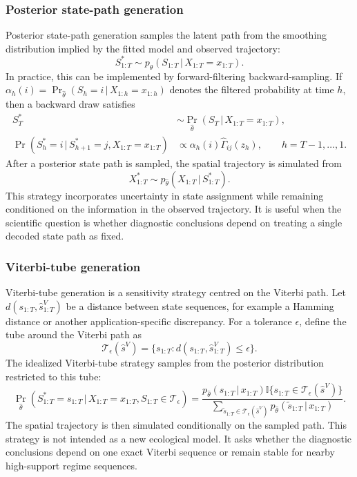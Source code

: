 \documentclass[11pt]{article}
\newcommand{\given}{\,\vert\,}
\newcommand{\ind}{\mathbb{I}}
\begin{document}
\subsubsection*{Posterior state-path generation}

Posterior state-path generation samples the latent path from the smoothing
distribution implied by the fitted model and observed trajectory:
\begin{equation*}
  S_{1:T}^{\ast}
  \sim
  p_{\hat{\theta}}(S_{1:T}\given X_{1:T}=x_{1:T}).
\end{equation*}
In practice, this can be implemented by forward-filtering backward-sampling.
If $\alpha_h(i)=\Pr_{\hat{\theta}}(S_h=i\given X_{1:h}=x_{1:h})$ denotes the
filtered probability at time $h$, then a backward draw satisfies
\begin{align*}
  S_T^{\ast}
  &\sim
  \Pr_{\hat{\theta}}(S_T\given X_{1:T}=x_{1:T}), \\
  \Pr(S_h^{\ast}=i\given S_{h+1}^{\ast}=j,X_{1:T}=x_{1:T})
  &\propto
  \alpha_h(i)\hat{\Gamma}_{ij}(z_h),
  \qquad h=T-1,\ldots,1 .
\end{align*}
After a posterior state path is sampled, the spatial trajectory is simulated
from
\[
  X_{1:T}^{\ast}
  \sim
  p_{\hat{\theta}}(X_{1:T}\given S_{1:T}^{\ast}).
\]
This strategy incorporates uncertainty in state assignment while remaining
conditioned on the information in the observed trajectory. It is useful when
the scientific question is whether diagnostic conclusions depend on treating a
single decoded state path as fixed.

\subsubsection*{Viterbi-tube generation}

Viterbi-tube generation is a sensitivity strategy centred on the Viterbi path.
Let $d(s_{1:T},\hat{s}_{1:T}^{V})$ be a distance between state sequences, for
example a Hamming distance or another application-specific discrepancy. For a
tolerance $\epsilon$, define the tube around the Viterbi path as
\begin{equation*}
  \mathcal{T}_{\epsilon}(\hat{s}^{V})
  =
  \{s_{1:T}: d(s_{1:T},\hat{s}_{1:T}^{V})\le \epsilon\}.
\end{equation*}
The idealized Viterbi-tube strategy samples from the posterior distribution
restricted to this tube:
\begin{equation*}
  \Pr_{\hat{\theta}}(S_{1:T}^{\ast}=s_{1:T}
  \given X_{1:T}=x_{1:T}, S_{1:T}\in\mathcal{T}_{\epsilon})
  =
  \frac{
    p_{\hat{\theta}}(s_{1:T}\given x_{1:T})
    \ind\{s_{1:T}\in\mathcal{T}_{\epsilon}(\hat{s}^{V})\}
  }{
    \sum_{\tilde{s}_{1:T}\in\mathcal{T}_{\epsilon}(\hat{s}^{V})}
    p_{\hat{\theta}}(\tilde{s}_{1:T}\given x_{1:T})
  }.
\end{equation*}
The spatial trajectory is then simulated conditionally on the sampled path.
This strategy is not intended as a new ecological model. It asks whether the
diagnostic conclusions depend on one exact Viterbi sequence or remain stable
for nearby high-support regime sequences.
\end{document}
